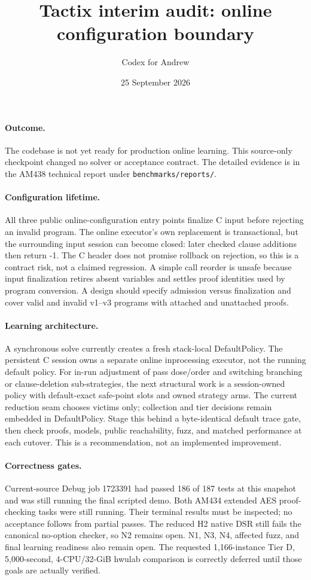 \documentclass[11pt]{article}
\title{Tactix interim audit: online configuration boundary}
\author{Codex for Andrew}
\date{25 September 2026}
\begin{document}
\maketitle

\paragraph{Outcome.} The codebase is not yet ready for production online
learning. This source-only checkpoint changed no solver or acceptance contract.
The detailed evidence is in the AM438 technical report under
\texttt{benchmarks/reports/}.

\paragraph{Configuration lifetime.} All three public online-configuration
entry points finalize C input before rejecting an invalid program. The online
executor's own replacement is transactional, but the surrounding input
session can become closed: later checked clause additions then return -1.
The C header does not promise rollback on rejection, so this is a contract
risk, not a claimed regression. A simple call reorder is unsafe because input
finalization retires absent variables and settles proof identities used by
program conversion. A design should specify admission versus finalization and
cover valid and invalid v1--v3 programs with attached and unattached proofs.

\paragraph{Learning architecture.} A synchronous solve currently creates a
fresh stack-local DefaultPolicy. The persistent C session owns a separate
online inprocessing executor, not the running default policy. For in-run
adjustment of pass dose/order and switching branching or clause-deletion
sub-strategies, the next structural work is a session-owned policy with
default-exact safe-point slots and owned strategy arms. The current reduction
seam chooses victims only; collection and tier decisions remain embedded in
DefaultPolicy. Stage this behind a byte-identical default trace gate, then
check proofs, models, public reachability, fuzz, and matched performance at
each cutover. This is a recommendation, not an implemented improvement.

\paragraph{Correctness gates.} Current-source Debug job 1723391 had passed
186 of 187 tests at this snapshot and was still running the final scripted
demo. Both AM434 extended AES proof-checking tasks were still running. Their
terminal results must be inspected; no acceptance follows from partial
passes. The reduced H2 native DSR still fails the canonical no-option checker,
so N2 remains open. N1, N3, N4, affected fuzz, and final learning readiness
also remain open. The requested 1,166-instance Tier D, 5,000-second,
4-CPU/32-GiB hwulab comparison is correctly deferred until those goals are
actually verified.
\end{document}
